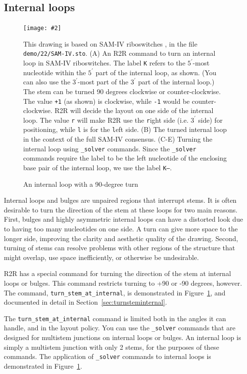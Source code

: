 \documentclass[letterpaper,12pt]{report}
\newcommand{\fig}[4]{
\begin{figure}
\texttt{[image: \#2]}
\caption{#3}

\begin{small}
#4
\end{small}
\label{#1}
\end{figure}
}
\begin{document}
\subsection{Internal loops}
\fig{fig:internalloop}{figures/turnsteminternal.pdf}{An internal loop with a 90-degree turn}{
This drawing is based on SAM-IV riboswitches \cite{SAMIV,Weinberg22Motifs}, in the file
{\tt demo/22/SAM-IV.sto}.
(A)
An R2R command to turn an internal loop in SAM-IV riboswitches.
The label {\tt K} refers to the $5^\prime$-most nucleotide within the $5^\prime$ part of the internal loop, as shown.
(You can also use the $3^\prime$-most part of the $3^\prime$ part of the internal loop.)
The stem can be turned 90 degrees clockwise or counter-clockwise.  The value {\tt +1} (as shown) is clockwise, while {\tt -1} would be counter-clockwise.
R2R will decide the layout on one side of the internal loop.  The value {\tt r} will make R2R use the {\tt r}ight side (i.e. $3^\prime$ side) for positioning,
while {\tt l} is for the {\tt l}eft side.
(B)
The turned internal loop in the context of the full SAM-IV consensus.
(C-E)
Turning the internal loop using {\tt \_solver} commands.
Since the {\tt \_solver} commands require the label to be the left nucleotide of the enclosing base pair of the internal loop, we use the label {\tt K--}.
}
Internal loops and bulges are unpaired regions that interrupt stems.
It is often desirable to turn the direction of the stem
at these loops for two main reasons.
First, bulges and highly asymmetric internal loops can have a distorted look due to having too many nucleotides on
one side.
A turn can give more space to the longer side, improving the clarity and aesthetic quality of the drawing.
Second, turning of stems can resolve problems with other regions of the structure that might overlap, use space inefficiently,
or otherwise be undesirable.

R2R has a special command for turning the direction of the stem at internal loops or bulges.
This command restricts turning to +90 or -90 degrees, however.
The command, {\tt turn\_stem\_at\_internal}, is demonstrated in Figure~\ref{fig:internalloop},
and documented in detail in Section~\ref{sec:turnsteminternal}.

The {\tt turn\_stem\_at\_internal} command is limited both in the angles it can handle,
and in the layout policy.
You can use the {\tt \_solver} commands that are designed for multistem junctions on internal loops or bulges.
An internal loop is simply a multistem junction with only 2 stems, for the purposes of these commands.
The application of {\tt \_solver} commands to internal loops is demonstrated in Figure~\ref{fig:internalloop}.
\end{document}

